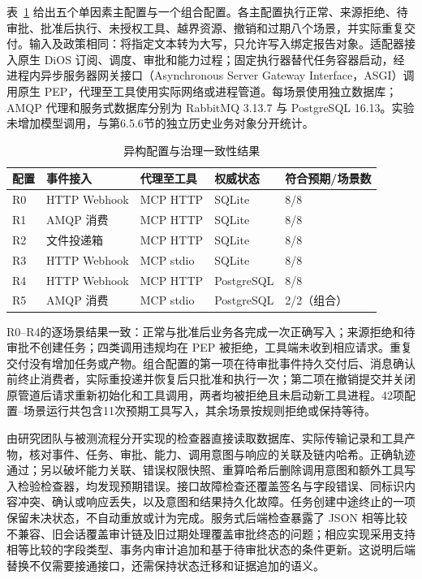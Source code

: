表~\ref{tab:heterogeneity-rr022} 给出五个单因素主配置与一个组合配置。各主配置执行正常、来源拒绝、待审批、批准后执行、未授权工具、越界资源、撤销和过期八个场景，并实际重复交付。输入及政策相同：将指定文本转为大写，只允许写入绑定报告对象。适配器接入原生 DiOS 订阅、调度、审批和能力过程；固定执行器替代任务容器启动，经进程内异步服务器网关接口（Asynchronous Server Gateway Interface，ASGI）调用原生 PEP，代理至工具使用实际网络或进程管道。每场景使用独立数据库；AMQP 代理和服务式数据库分别为 RabbitMQ 3.13.7 与 PostgreSQL 16.13。实验未增加模型调用，与第6.5.6节的独立历史业务对象分开统计。

\begin{table}[htbp]
\centering
\caption{异构配置与治理一致性结果}
\label{tab:heterogeneity-rr022}
\small
\begin{tabular}{lllll}
\toprule
配置 & 事件接入 & 代理至工具 & 权威状态 & 符合预期/场景数 \\
\midrule
R0 & HTTP Webhook & MCP HTTP & SQLite & 8/8 \\
R1 & AMQP 消费 & MCP HTTP & SQLite & 8/8 \\
R2 & 文件投递箱 & MCP HTTP & SQLite & 8/8 \\
R3 & HTTP Webhook & MCP stdio & SQLite & 8/8 \\
R4 & HTTP Webhook & MCP HTTP & PostgreSQL & 8/8 \\
R5 & AMQP 消费 & MCP stdio & PostgreSQL & 2/2（组合） \\
\bottomrule
\end{tabular}
\end{table}

R0--R4的逐场景结果一致：正常与批准后业务各完成一次正确写入；来源拒绝和待审批不创建任务；四类调用违规均在 PEP 被拒绝，工具端未收到相应请求。重复交付没有增加任务或产物。组合配置的第一项在待审批事件持久交付后、消息确认前终止消费者，实际重投递并恢复后只批准和执行一次；第二项在撤销提交并关闭原管道后请求重新初始化和工具调用，两者均被拒绝且未启动新工具进程。42项配置--场景运行共包含11次预期工具写入，其余场景按规则拒绝或保持等待。

由研究团队与被测流程分开实现的检查器直接读取数据库、实际传输记录和工具产物，核对事件、任务、审批、能力、调用意图与响应的关联及链内哈希。正确轨迹通过；另以破坏能力关联、错误权限快照、重算哈希后删除调用意图和额外工具写入检验检查器，均发现预期错误。接口故障检查还覆盖签名与字段错误、同标识内容冲突、确认或响应丢失，以及意图和结果持久化故障。任务创建中途终止的一项保留未决状态，不自动重放或计为完成。服务式后端检查暴露了 JSON 相等比较不兼容、旧会话覆盖审计链及旧过期处理覆盖审批终态的问题；相应实现采用支持相等比较的字段类型、事务内审计追加和基于待审批状态的条件更新。这说明后端替换不仅需要接通接口，还需保持状态迁移和证据追加的语义。

